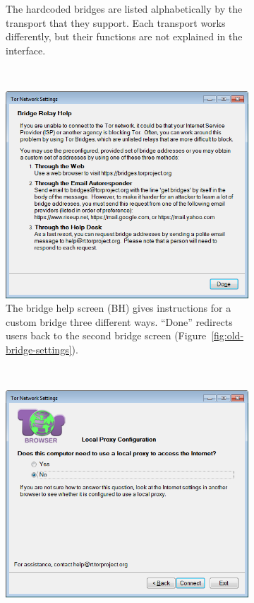 \documentclass[USenglish,oneside,twocolumn]{article}
\begin{document}
\begin{figure}
\begin{subfigure}[b]{0.30\textwidth}
	\centering\captionsetup{width=1.5\linewidth}%
	\caption{The hardcoded bridges are listed alphabetically by the transport that they support. Each transport works differently, but their functions are not explained in the interface.}
	\label{fig:old-bridge-combobox}
\end{subfigure}
~~~~~~~~~~
\begin{subfigure}[b]{0.30\textwidth}
	\includegraphics[width=\textwidth]{screenshots/OLD-bridgeHelp.png}
	\centering\captionsetup{width=1.5\linewidth}%
	\caption{The bridge help screen (BH) gives instructions for a custom bridge three different ways. ``Done'' redirects users back to the second bridge screen (Figure~\ref{fig:old-bridge-settings}).}
	\label{fig:old-bridge-help}
\end{subfigure}
~~~~~~~~~~~~~~~~~~~~~~~~~
\begin{subfigure}[b]{0.30\textwidth}
	\includegraphics[width=\textwidth]{screenshots/OLD-proxy.png}

\end{subfigure}
\end{figure}
\end{document}

